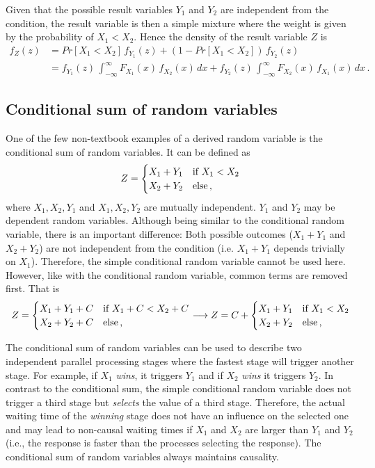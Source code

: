 Given that the possible result variables $Y_1$
and $Y_2$ are independent from the condition, the result variable is then a simple mixture where the weight
is given by the probability of $X_1<X_2$. Hence the density of the result variable $Z$ is
\begin{align}
 f_Z(z) &= Pr[X_1<X_2]\,f_{Y_1}(z) + \left(1-Pr[X_1<X_2]\right)\,f_{Y_2}(z) \nonumber \\
    &= f_{Y_1}(z)\,\int_{-\infty}^{\infty}F_{X_1}(x)\,f_{X_2}(x)\,dx + 
    f_{Y_2}(z)\,\int_{-\infty}^{\infty}F_{X_2}(x)\,f_{X_1}(x)\,dx\,.\nonumber
\end{align}

\subsection{Conditional sum of random variables}
One of the few non-textbook examples of a derived random variable is the conditional sum of random variables. 
It can be defined as
\begin{equation}
 Z = \begin{cases}
   X_1 + Y_1 & \mbox{if } X_1 < X_2\\
   X_2 + Y_2 & \mbox{else\,,} 
 \end{cases} \nonumber
\end{equation}
where $X_1, X_2, Y_1$ and $X_1, X_2, Y_2$ are mutually independent. $Y_1$ and $Y_2$ may be 
dependent random variables. Although being similar to the conditional random variable, there is an 
important difference: Both possible outcomes ($X_1+Y_1$ and $X_2+Y_2$) 
are not independent from the condition (i.e. $X_1+Y_1$ depends trivially on $X_1$).
Therefore, the simple conditional random variable cannot be used here. However, like with the
conditional random variable, common terms are removed first. That is
\begin{equation}
 Z = \begin{cases}
   X_1 + Y_1 + C& \mbox{if } X_1 + C < X_2 + C\\
   X_2 + Y_2 + C& \mbox{else\,,} 
 \end{cases} \longrightarrow 
 Z = C + \begin{cases}
   X_1 + Y_1 & \mbox{if } X_1 < X_2\\
   X_2 + Y_2 & \mbox{else\,,} 
 \end{cases} \nonumber
\end{equation}


The conditional sum of random variables can be used to describe two independent parallel processing
stages where the fastest stage will trigger another stage. For example, if $X_1$ \emph{wins}, it triggers $Y_1$
and if $X_2$ \emph{wins} it triggers $Y_2$. In contrast to the conditional sum, the 
simple conditional random variable does not trigger a third stage but \emph{selects} the value of a third stage. 
Therefore, the actual waiting time of the \emph{winning} stage does not have an influence on the 
selected one and may lead to non-causal waiting times if $X_1$ and $X_2$ are larger than $Y_1$ and
$Y_2$ (i.e., the response is faster than the processes selecting the response). The conditional sum
of random variables always maintains causality.  	

